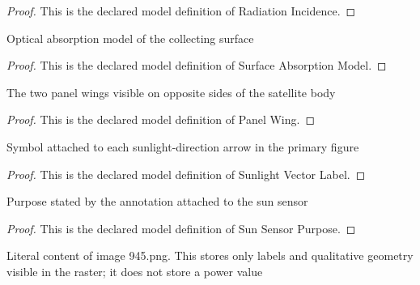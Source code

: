 \begin{proof}
  This is the declared model definition of Radiation Incidence.
\end{proof}
\begin{definition}
  \label{def:physics:phyx-mini-0945:phyxminiproblems-problemphyxmini0945-surfaceabsorptionmodel}
  Optical absorption model of the collecting surface
\end{definition}
\begin{proof}
  This is the declared model definition of Surface Absorption Model.
\end{proof}
\begin{definition}
  \label{def:physics:phyx-mini-0945:phyxminiproblems-problemphyxmini0945-panelwing}
  The two panel wings visible on opposite sides of the satellite body
\end{definition}
\begin{proof}
  This is the declared model definition of Panel Wing.
\end{proof}
\begin{definition}
  \label{def:physics:phyx-mini-0945:phyxminiproblems-problemphyxmini0945-sunlightvectorlabel}
  Symbol attached to each sunlight-direction arrow in the primary figure
\end{definition}
\begin{proof}
  This is the declared model definition of Sunlight Vector Label.
\end{proof}
\begin{definition}
  \label{def:physics:phyx-mini-0945:phyxminiproblems-problemphyxmini0945-sunsensorpurpose}
  Purpose stated by the annotation attached to the sun sensor
\end{definition}
\begin{proof}
  This is the declared model definition of Sun Sensor Purpose.
\end{proof}
\begin{definition}
  \label{def:physics:phyx-mini-0945:phyxminiproblems-problemphyxmini0945-satellitesolarpanelfigure}
  Literal content of image 945.png. This stores only labels and qualitative geometry visible in the raster; it does not store a power value
\end{definition}
